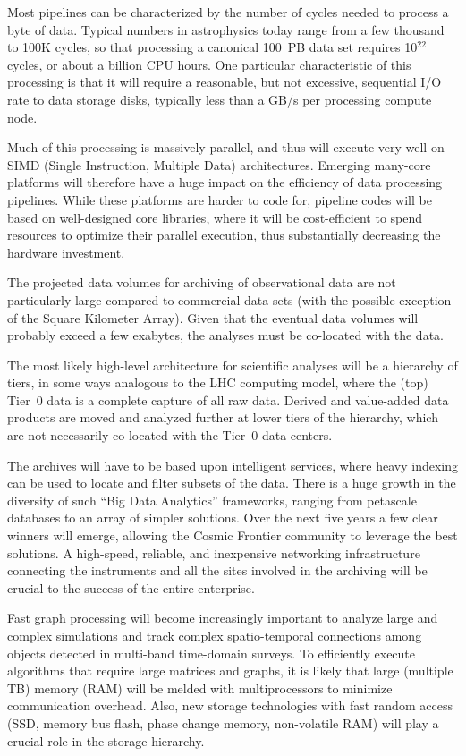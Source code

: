 Most pipelines can be characterized by the number of cycles needed to
process a byte of data. Typical numbers in astrophysics today range
from a few thousand to 100K cycles, so that processing a canonical
100~PB data set requires 10$^{22}$ cycles, or about a billion CPU
hours. One particular characteristic of this processing is that it
will require a reasonable, but not excessive, sequential I/O rate to
data storage disks, typically less than a GB/s per processing compute
node.

Much of this processing is massively parallel, and thus will execute
very well on SIMD (Single Instruction, Multiple Data)
architectures. Emerging many-core platforms will therefore have a huge
impact on the efficiency of data processing pipelines. While these
platforms are harder to code for, pipeline codes will be based on
well-designed core libraries, where it will be cost-efficient to spend
resources to optimize their parallel execution, thus substantially
decreasing the hardware investment.

The projected data volumes for archiving of observational data are not
particularly large compared to commercial data sets (with the possible
exception of the Square Kilometer Array). Given that the eventual data
volumes will probably exceed a few exabytes, the analyses must be
co-located with the data.

The most likely high-level architecture for scientific analyses will
be a hierarchy of tiers, in some ways analogous to the LHC computing
model, where the (top) Tier~0 data is a complete capture of all raw data.
Derived and value-added data products are moved and analyzed
further at lower tiers of the hierarchy, which are not necessarily
co-located with the Tier~0 data centers.

The archives will have to be based upon intelligent services, where
heavy indexing can be used to locate and filter subsets of the
data. There is a huge growth in the diversity of such ``Big Data
Analytics'' frameworks, ranging from petascale databases to an array
of simpler solutions. Over the next five years a few clear winners
will emerge, allowing the Cosmic Frontier community to leverage the
best solutions. A high-speed, reliable, and inexpensive networking
infrastructure connecting the instruments and all the sites involved
in the archiving will be crucial to the success of the entire
enterprise.

Fast graph processing will become increasingly important to analyze
large and complex simulations and track complex spatio-temporal
connections among objects detected in multi-band time-domain
surveys. To efficiently execute algorithms that require large matrices
and graphs, it is likely that large (multiple TB) memory (RAM) will be
melded with multiprocessors to minimize communication overhead. Also,
new storage technologies with fast random access (SSD, memory bus
flash, phase change memory, non-volatile RAM) will play a crucial role
in the storage hierarchy.

